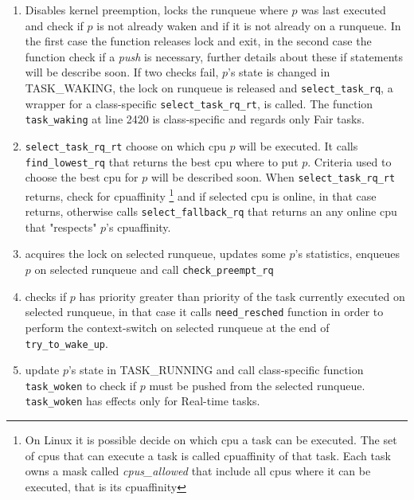 \begin{enumerate}
\item Disables kernel preemption, locks the runqueue where $p$ was last executed and check 
if $p$ is not already waken and if it is not already on a runqueue. In the first case the 
function releases lock and exit, in the second case the function check if a
\textit{push} is necessary, further details about these if statements will be
describe soon. If two checks fail, $p$'s state is changed in TASK\_WAKING, the
lock on runqueue is released and \texttt{select\_task\_rq}, a wrapper for a 
class-specific \texttt{select\_task\_rq\_rt}, is called. The function 
\texttt{task\_waking} at line 2420 is class-specific and regards only Fair tasks.

\lstset{basicstyle=\footnotesize, language=c, captionpos=b, frame=single,label=lis:steps}


\item \texttt{select\_task\_rq\_rt} choose on which cpu $p$ will be executed. It
calls \texttt{find\_lowest\_rq} that returns the best cpu where to put $p$. Criteria
used to choose the best cpu for $p$ will be described soon. When \texttt{select\_task\_rq\_rt} 
returns, check for cpuaffinity \footnote{On Linux it is possible decide on which
cpu a task can be executed. The set of cpus that can execute a task is called 
cpuaffinity of that task. Each task owns a mask called \textit{cpus\_allowed} 
that include all cpus where it can be executed, that is its cpuaffinity} and 
if selected cpu is online, in that case returns, otherwise calls 
\texttt{select\_fallback\_rq} that returns an any online cpu that "respects" 
$p$'s cpuaffinity.

\lstset{basicstyle=\footnotesize, language=c, captionpos=b, frame=single,label=lis:steps}


\item acquires the lock on selected runqueue, updates some $p$'s statistics, enqueues 
$p$ on selected runqueue and call \texttt{check\_preempt\_rq} 

\lstset{basicstyle=\footnotesize, language=c, captionpos=b, frame=single,label=lis:steps}


\item checks if $p$ has priority greater than priority of the task currently
executed on selected runqueue, in that case it calls \texttt{need\_resched}
function in order to perform the context-switch on selected runqueue at the
end of \texttt{try\_to\_wake\_up}.

\lstset{basicstyle=\footnotesize, language=c, captionpos=b, frame=single,label=lis:steps}


\item update $p$'s state in TASK\_RUNNING and call class-specific function 
\texttt{task\_woken} to check if $p$ must be pushed from the selected runqueue.
\texttt{task\_woken} has effects only for Real-time tasks.

\lstset{basicstyle=\footnotesize, language=c, captionpos=b, frame=single,label=lis:steps}


\end{enumerate}

